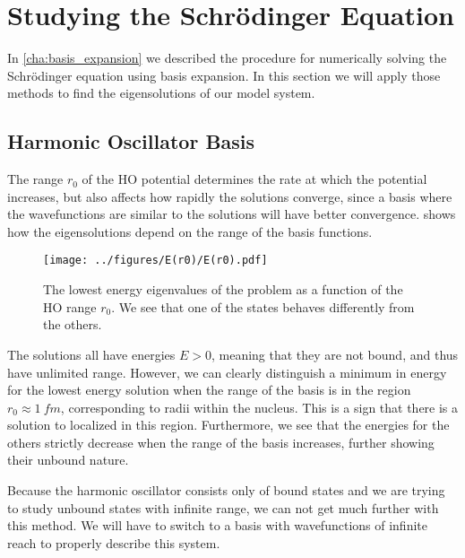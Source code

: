\documentclass[../main/report.tex]{subfiles}
\begin{document}
\section{Studying the  Schrödinger Equation}
In \cref{cha:basis_expansion} we described the procedure for numerically solving the Schrödinger equation using basis expansion. 
In this section we will apply those methods to find the eigensolutions of our model system. 

\subsection{Harmonic Oscillator Basis}
The range $r_0$ of the HO potential determines the rate at which the potential increases, but also affects how rapidly the solutions converge, since a basis where the wavefunctions are similar to the solutions will have better convergence. 
 shows how the eigensolutions depend on the range of the basis functions.


\begin{figure}[ht!]
  \centering
 	\texttt{[image: ../figures/E(r0)/E(r0).pdf]}
  \caption{The lowest energy eigenvalues of the  problem as a function of the HO range $r_0$. We see that one of the states behaves differently from the others.}
  \label{fig:energies(r0)}
\end{figure}


The solutions all have energies $E>0$, meaning that they are not bound, and thus have unlimited range. 
However, we can clearly distinguish a minimum in energy for the lowest energy solution when the range of the basis is in the region $r_0 \approx \SI{1}{fm}$, corresponding to radii within the nucleus. 
This is a sign that there is a solution to  localized in this region. 
Furthermore, we see that the energies for the others strictly decrease when the range of the basis increases, further showing their unbound nature.

Because the harmonic oscillator consists only of bound states and we are trying to study unbound states with infinite range, we can not get much further with this method.
We will have to switch to a basis with wavefunctions of infinite reach to properly describe this system.
\end{document}
